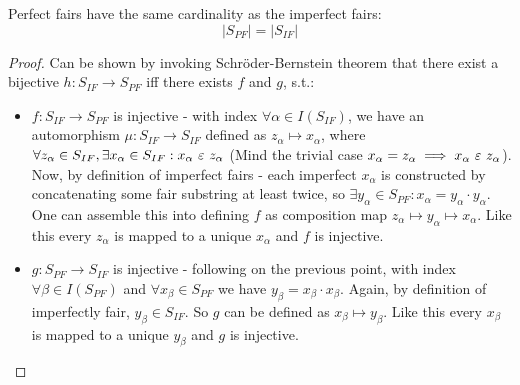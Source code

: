 \begin{lemma}\label{lemma_perf_imp_card}
  Perfect fairs have the same cardinality as the imperfect fairs: \[ |S_{PF}| = |S_{IF}| \]
\end{lemma}
\begin{proof}
  Can be shown by invoking Schröder-Bernstein theorem that there exist a bijective $h: S_{IF} \to S_{PF}$ iff there exists $f$ and $g$, s.t.: 
  \begin{itemize}
    \item $f: S_{IF} \to S_{PF}$ is injective - with index $\forall \alpha \in I(S_{IF})$, we have an automorphism $\mu: S_{IF} \to S_{IF}$ defined as $z_\alpha \mapsto x_\alpha$, where  $\forall z_\alpha \in S_{IF}, \exists x_\alpha \in S_{IF}:  x_\alpha \ \varepsilon\  z_\alpha$ (Mind the trivial case $x_\alpha = z_\alpha \implies x_\alpha \ \varepsilon\  z_\alpha$). Now, by definition of imperfect fairs - each imperfect $x_\alpha$ is constructed by concatenating some fair substring at least twice, so $\exists y_\alpha \in S_{PF}: x_\alpha = y_\alpha \cdot y_\alpha$. One can assemble this into defining $f$ as composition map $z_\alpha \mapsto y_\alpha \mapsto x_\alpha$. Like this every $z_\alpha$ is mapped to a unique $x_\alpha$ and $f$ is injective.
    \item  $g: S_{PF} \to S_{IF}$ is injective - following on the previous point, with index $\forall \beta \in I(S_{PF})$ and $\forall x_\beta \in S_{PF}$ we have $y_\beta = x_\beta \cdot x_\beta$. Again, by definition of imperfectly fair, $y_\beta \in S_{IF}$. So $g$ can be defined as $x_\beta \mapsto y_\beta$. Like this every $x_\beta$ is mapped to a unique $y_\beta$ and $g$ is injective.
  \end{itemize}
\end{proof}

